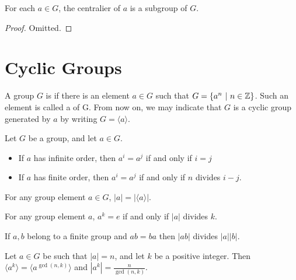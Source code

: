 \documentclass[12pt]{scrartcl}
\begin{document}
\begin{theorem}[$C(a)$ is a Subgroup]
  For each $a \in G$, the centralier of $a$ is a subgroup of $G$.
  \begin{proof}
    Omitted.
  \end{proof}
\end{theorem}

\section{Cyclic Groups}

\begin{definition}
  A group $G$ is  if there is an element $a \in G$ such that $G = \{a^n \ | \ n \in \mathbb Z\}$. Such an 
  element is called a  of G. From now on, we may indicate that $G$ is a cyclic group generated by $a$ 
  by writing $G = \langle a \rangle$. 
\end{definition}

\begin{theorem}[Criterion for $a^i = a^j$]
  Let $G$ be a group, and let $a \in G$.
  \begin{itemize}
    \item If $a$ has infinite order, then $a^i = a^j$ if and only if $i = j$
    \item If $a$ has finite order, then $a^i = a^j$ if and only if $n$ divides $i - j$. 
  \end{itemize}
\end{theorem}

\begin{corollary}
  For any group element $a \in G$, $|a| = |\langle a \rangle|$. 
\end{corollary}

\begin{corollary}
  For any group element $a$, $a^k = e$ if and only if $|a|$ divides $k$. 
\end{corollary}

\begin{corollary}
  If $a, b$ belong to a finite group and $ab = ba$ then $|ab|$ divides $|a||b|$. 
\end{corollary}

\begin{theorem}
  Let $a \in G$ be such that $|a| = n$, and let $k$ be a positive integer. Then $\langle a^k \rangle = \langle a^{\gcd(n, k)}\rangle$ and 
  $|a^k| = \frac{n}{\gcd(n, k)}$. 
\end{theorem}
\end{document}
